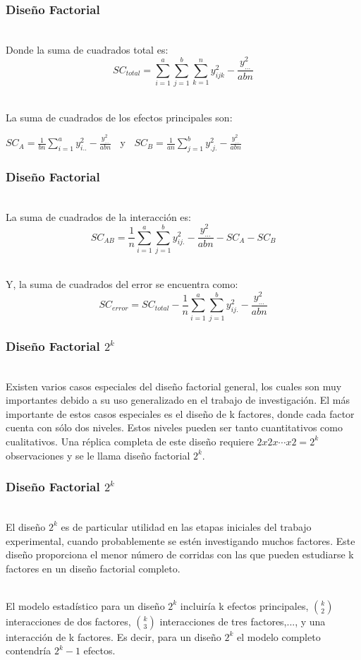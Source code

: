 \documentclass[12pt]{beamer}
\begin{document}
\begin{frame}
\frametitle{Diseño Factorial}
~\\Donde la suma de cuadrados total es:
$$SC_{total}=\sum\limits_{i=1}^a \sum\limits_{j=1}^b \sum\limits_{k=1}^n y^2_{ijk}-\frac{y^2_{\ldots}}{abn}$$

~\\La suma de cuadrados de los efectos principales son:
\begin{center}
$SC_A=\frac{1}{bn}\sum\limits_{i=1}^a y^2_{i..} - \frac{y^2_{\ldots}}{abn}\;\;$ y $\;\;SC_B=\frac{1}{an}\sum\limits_{j=1}^b y^2_{.j.} - \frac{y^2_{\ldots}}{abn}$
\end{center}

\end{frame}

\begin{frame}
\frametitle{Diseño Factorial}
~\\La suma de cuadrados de la interacción es:
$$SC_{AB}=\frac{1}{n}\sum\limits_{i=1}^a\sum\limits_{j=1}^b y^2_{ij.}-\frac{y^2_{\ldots}}{abn}-SC_{A}-SC_{B}$$

~\\Y, la suma de cuadrados del error se encuentra como:
$$SC_{error}=SC_{total}-\frac{1}{n}\sum\limits_{i=1}^a\sum\limits_{j=1}^b y^2_{ij.}-\frac{y^2_{\ldots}}{abn}$$
\end{frame}

\begin{frame}
\frametitle{Diseño Factorial $2^{k}$}
~\\Existen varios casos especiales del diseño factorial general, los cuales son muy importantes debido a su uso generalizado en el trabajo de investigación. El más importante de estos casos especiales es el diseño de k factores, donde cada factor cuenta con sólo dos niveles. Estos niveles pueden ser tanto cuantitativos como cualitativos. Una réplica completa de este diseño requiere $2 x 2 x\cdots x 2 =2^k$ observaciones y se le llama diseño factorial $2^k$.
\end{frame}

\begin{frame}
\frametitle{Diseño Factorial $ 2^{k} $}
~\\El diseño $2^k$ es de particular utilidad en las etapas iniciales del trabajo experimental, cuando probablemente se estén investigando muchos factores. Este diseño proporciona el menor número de corridas con las que pueden estudiarse k factores en un diseño factorial completo.

~\\El modelo estadístico para un diseño $2^k$ incluiría k efectos principales, $\binom{k}{2}$ interacciones de dos factores, $\binom{k}{3}$ interacciones de tres factores,..., y una interacción de k factores. Es decir, para un diseño $2^k$ el modelo completo contendría $2^k-1$ efectos.
\end{frame}
\end{document}
